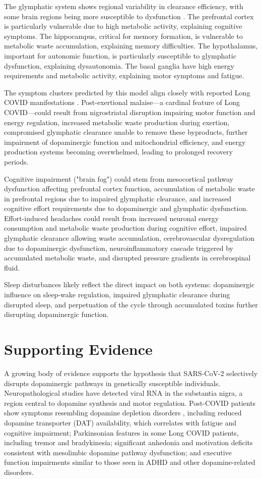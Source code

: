 \documentclass[12pt]{article}
\begin{document}
The glymphatic system shows regional variability in clearance efficiency, with some brain regions being more susceptible to dysfunction \citep{Kress2014}. The prefrontal cortex is particularly vulnerable due to high metabolic activity, explaining cognitive symptoms. The hippocampus, critical for memory formation, is vulnerable to metabolic waste accumulation, explaining memory difficulties. The hypothalamus, important for autonomic function, is particularly susceptible to glymphatic dysfunction, explaining dysautonomia. The basal ganglia have high energy requirements and metabolic activity, explaining motor symptoms and fatigue.

The symptom clusters predicted by this model align closely with reported Long COVID manifestations \citep{Graham2021, Davis2021}. Post-exertional malaise—a cardinal feature of Long COVID—could result from nigrostriatal disruption impairing motor function and energy regulation, increased metabolic waste production during exertion, compromised glymphatic clearance unable to remove these byproducts, further impairment of dopaminergic function and mitochondrial efficiency, and energy production systems becoming overwhelmed, leading to prolonged recovery periods.

Cognitive impairment ("brain fog") could stem from mesocortical pathway dysfunction affecting prefrontal cortex function, accumulation of metabolic waste in prefrontal regions due to impaired glymphatic clearance, and increased cognitive effort requirements due to dopaminergic and glymphatic dysfunction. Effort-induced headaches could result from increased neuronal energy consumption and metabolic waste production during cognitive effort, impaired glymphatic clearance allowing waste accumulation, cerebrovascular dysregulation due to dopaminergic dysfunction, neuroinflammatory cascade triggered by accumulated metabolic waste, and disrupted pressure gradients in cerebrospinal fluid.

Sleep disturbances likely reflect the direct impact on both systems: dopaminergic influence on sleep-wake regulation, impaired glymphatic clearance during disrupted sleep, and perpetuation of the cycle through accumulated toxins further disrupting dopaminergic function.

\section{Supporting Evidence}

A growing body of evidence supports the hypothesis that SARS-CoV-2 selectively disrupts dopaminergic pathways in genetically susceptible individuals. Neuropathological studies have detected viral RNA in the substantia nigra, a region central to dopamine synthesis and motor regulation. Post-COVID patients show symptoms resembling dopamine depletion disorders \citep{Brundin2020, Devine2022}, including reduced dopamine transporter (DAT) availability, which correlates with fatigue and cognitive impairment; Parkinsonian features in some Long COVID patients, including tremor and bradykinesia; significant anhedonia and motivation deficits consistent with mesolimbic dopamine pathway dysfunction; and executive function impairments similar to those seen in ADHD and other dopamine-related disorders.
\end{document}
